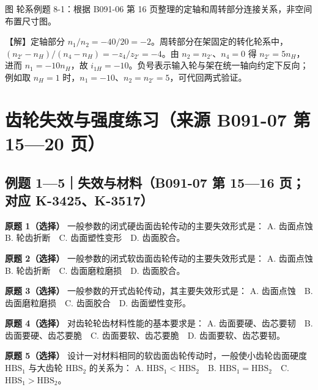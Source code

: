 \documentclass[zihao=5,a4paper,UTF8,fontset=fandol]{ctexart}
\begin{document}
\begin{center}
\end{center}


图 轮系例题 8-1：根据 B091-06 第 16 页整理的定轴和周转部分连接关系，非空间布置尺寸图。


【解】定轴部分 $n_1/n_2=-40/20=-2$。周转部分在架固定的转化轮系中，$(n_{2'}-n_H)/(n_4-n_H)=-z_4/z_{2'}=-4$。由 $n_2=n_{2'}$、$n_4=0$ 得 $n_{2'}=5n_H$，进而 $n_1=-10n_H$，故 $i_{1H}=-10$。负号表示输入轮与架在统一轴向约定下反向；例如取 $n_H=1$ 时，$n_1=-10$、$n_2=n_{2'}=5$，可代回两式验证。




\section{齿轮失效与强度练习（来源 B091-07 第 15—20 页）}

\subsection{例题 1—5｜失效与材料（B091-07 第 15—16 页；对应 K-3425、K-3517）}

\textbf{原题 1（选择）} 一般参数的闭式硬齿面齿轮传动的主要失效形式是：
A. 齿面点蚀　B. 轮齿折断　C. 齿面塑性变形　D. 齿面胶合。


\textbf{原题 2（选择）} 一般参数的闭式软齿面齿轮传动的主要失效形式是：
A. 齿面点蚀　B. 轮齿折断　C. 齿面磨粒磨损　D. 齿面胶合。


\textbf{原题 3（选择）} 一般参数的开式齿轮传动，其主要失效形式是：
A. 齿面点蚀　B. 齿面磨粒磨损　C. 齿面胶合　D. 齿面塑性变形。


\textbf{原题 4（选择）} 对齿轮轮齿材料性能的基本要求是：
A. 齿面要硬、齿芯要韧　B. 齿面要硬、齿芯要脆　C. 齿面要软、齿芯要脆　D. 齿面要软、齿芯要韧。


\textbf{原题 5（选择）} 设计一对材料相同的软齿面齿轮传动时，一般使小齿轮齿面硬度 $\mathrm{HBS}_1$ 与大齿轮 $\mathrm{HBS}_2$ 的关系为：
A. $\mathrm{HBS}_1<\mathrm{HBS}_2$　B. $\mathrm{HBS}_1=\mathrm{HBS}_2$　C. $\mathrm{HBS}_1>\mathrm{HBS}_2$。
\end{document}
